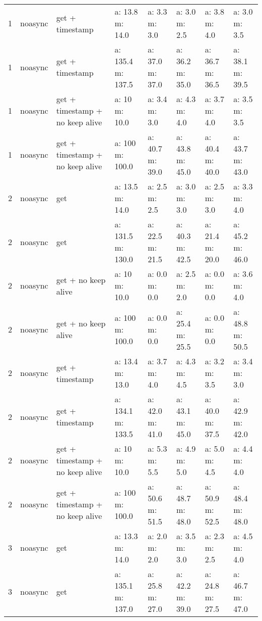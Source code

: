 \documentclass[a4paper]{report}
\begin{document}
\begin{table}[]
\begin{tabular}{l l l l|l l l l}
		1         & noasync & get + timestamp                 & a: 13.8 m: 14.0   & a: 3.3 m: 3.0   & a: 3.0 m: 2.5   & a: 3.8 m: 4.0   & a: 3.0 m: 3.5   \\
		1         & noasync & get + timestamp                 & a: 135.4 m: 137.5 & a: 37.0 m: 37.0 & a: 36.2 m: 35.0 & a: 36.7 m: 36.5 & a: 38.1 m: 39.5 \\
		1         & noasync & get + timestamp + no keep alive & a: 10 m: 10.0     & a: 3.4 m: 3.0   & a: 4.3 m: 4.0   & a: 3.7 m: 4.0   & a: 3.5 m: 3.5   \\
		1         & noasync & get + timestamp + no keep alive & a: 100 m: 100.0   & a: 40.7 m: 39.0 & a: 43.8 m: 45.0 & a: 40.4 m: 40.0 & a: 43.7 m: 43.0 \\
		2         & noasync & get                             & a: 13.5 m: 14.0   & a: 2.5 m: 2.5   & a: 3.0 m: 3.0   & a: 2.5 m: 3.0   & a: 3.3 m: 4.0   \\
		2         & noasync & get                             & a: 131.5 m: 130.0 & a: 22.5 m: 21.5 & a: 40.3 m: 42.5 & a: 21.4 m: 20.0 & a: 45.2 m: 46.0 \\
		2         & noasync & get + no keep alive             & a: 10 m: 10.0     & a: 0.0 m: 0.0   & a: 2.5 m: 2.0   & a: 0.0 m: 0.0   & a: 3.6 m: 4.0   \\
		2         & noasync & get + no keep alive             & a: 100 m: 100.0   & a: 0.0 m: 0.0   & a: 25.4 m: 25.5 & a: 0.0 m: 0.0   & a: 48.8 m: 50.5 \\
		2         & noasync & get + timestamp                 & a: 13.4 m: 13.0   & a: 3.7 m: 4.0   & a: 4.3 m: 4.5   & a: 3.2 m: 3.5   & a: 3.4 m: 3.0   \\
		2         & noasync & get + timestamp                 & a: 134.1 m: 133.5 & a: 42.0 m: 41.0 & a: 43.1 m: 45.0 & a: 40.0 m: 37.5 & a: 42.9 m: 42.0 \\
		2         & noasync & get + timestamp + no keep alive & a: 10 m: 10.0     & a: 5.3 m: 5.5   & a: 4.9 m: 5.0   & a: 5.0 m: 4.5   & a: 4.4 m: 4.0   \\
		2         & noasync & get + timestamp + no keep alive & a: 100 m: 100.0   & a: 50.6 m: 51.5 & a: 48.7 m: 48.0 & a: 50.9 m: 52.5 & a: 48.4 m: 48.0 \\
		3         & noasync & get                             & a: 13.3 m: 14.0   & a: 2.0 m: 2.0   & a: 3.5 m: 3.0   & a: 2.3 m: 2.5   & a: 4.5 m: 4.0   \\
		3         & noasync & get                             & a: 135.1 m: 137.0 & a: 25.8 m: 27.0 & a: 42.2 m: 39.0 & a: 24.8 m: 27.5 & a: 46.7 m: 47.0 \\

\end{tabular}
\end{table}
\end{document}
